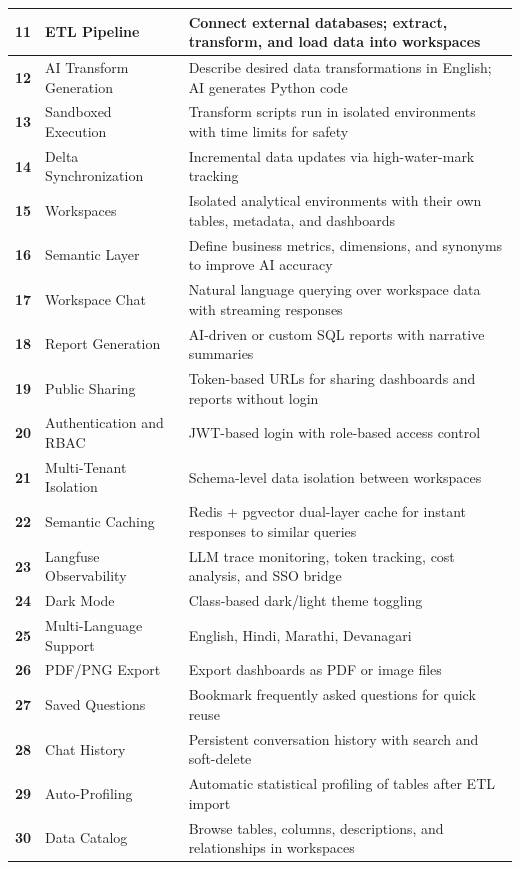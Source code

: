 \documentclass[12pt,a4paper]{report}
\begin{document}
\begin{longtable}{>{\bfseries}p{1cm} p{4cm} p{7.5cm}}
\midrule
11 & ETL Pipeline & Connect external databases; extract, transform, and load data into workspaces \\
\midrule
12 & AI Transform Generation & Describe desired data transformations in English; AI generates Python code \\
\midrule
13 & Sandboxed Execution & Transform scripts run in isolated environments with time limits for safety \\
\midrule
14 & Delta Synchronization & Incremental data updates via high-water-mark tracking \\
\midrule
15 & Workspaces & Isolated analytical environments with their own tables, metadata, and dashboards \\
\midrule
16 & Semantic Layer & Define business metrics, dimensions, and synonyms to improve AI accuracy \\
\midrule
17 & Workspace Chat & Natural language querying over workspace data with streaming responses \\
\midrule
18 & Report Generation & AI-driven or custom SQL reports with narrative summaries \\
\midrule
19 & Public Sharing & Token-based URLs for sharing dashboards and reports without login \\
\midrule
20 & Authentication and RBAC & JWT-based login with role-based access control \\
\midrule
21 & Multi-Tenant Isolation & Schema-level data isolation between workspaces \\
\midrule
22 & Semantic Caching & Redis + pgvector dual-layer cache for instant responses to similar queries \\
\midrule
23 & Langfuse Observability & LLM trace monitoring, token tracking, cost analysis, and SSO bridge \\
\midrule
24 & Dark Mode & Class-based dark/light theme toggling \\
\midrule
25 & Multi-Language Support & English, Hindi, Marathi, Devanagari \\
\midrule
26 & PDF/PNG Export & Export dashboards as PDF or image files \\
\midrule
27 & Saved Questions & Bookmark frequently asked questions for quick reuse \\
\midrule
28 & Chat History & Persistent conversation history with search and soft-delete \\
\midrule
29 & Auto-Profiling & Automatic statistical profiling of tables after ETL import \\
\midrule
30 & Data Catalog & Browse tables, columns, descriptions, and relationships in workspaces \\
\bottomrule
\end{longtable}
\end{document}
